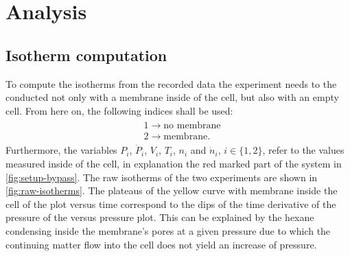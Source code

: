 \documentclass[../thesis.tex]{subfiles}
\begin{document}
    \chapter{Analysis}
    \label{ch:analysis}


      \section{Isotherm computation}
      \label{sec:isotherm-computation}

        To compute the isotherms from the recorded data the experiment needs to the conducted not only with a membrane inside of the cell, but also with an empty cell. From here on, the following indices shall be used:
        \begin{align*}
            \begin{split}
                &1 \longrightarrow \textrm{no membrane} \\
                &2 \longrightarrow \textrm{membrane}.
                \label{eq:index_assignments}
            \end{split}
        \end{align*}
        Furthermore, the variables $P_i$, $\dot{P}_i$, $V_i$, $T_i$, $n_i$ and $\dot{n}_i$, $i\in \{1,2\}$, refer to the values measured inside of the cell, in explanation the red marked part of the system in \cref{fig:setup-bypass}. The raw isotherms of the two experiments are shown in \cref{fig:raw-isotherms}. The plateaus of the yellow curve with membrane inside the cell of the plot versus time  correspond to the dips of the time derivative of the pressure of the versus pressure plot. This can be explained by the hexane condensing inside the membrane's pores at a given pressure due to which the continuing matter flow into the cell does not yield an increase of pressure.
        \medskip

        
\end{document}
